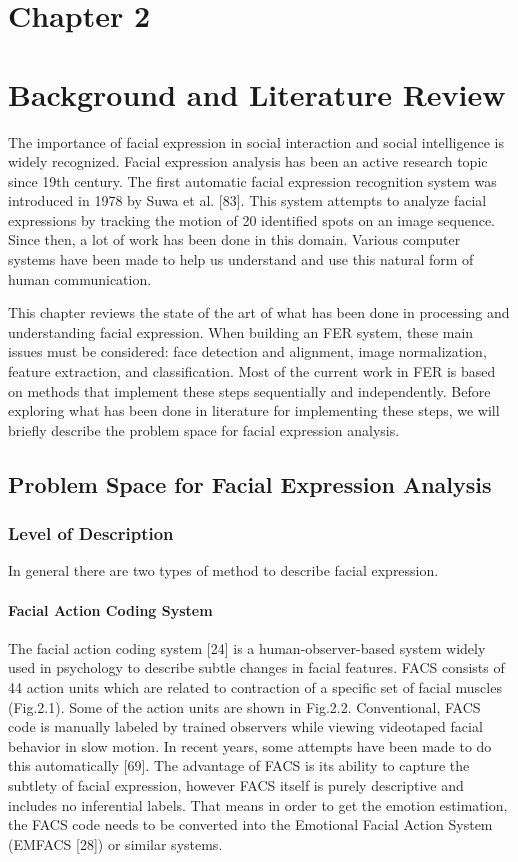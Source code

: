 \documentclass[12pt, twoside]{report}
\begin{document}
\chapter{Chapter 2}
 
\chapter{\huge Background and Literature Review}
The importance of facial expression in social interaction and social intelligence is widely
recognized. Facial expression analysis has been an active research topic since 19th century.
The first automatic facial expression recognition system was introduced in 1978 by Suwa
et al. [83]. This system attempts to analyze facial expressions by tracking the motion of
20 identified spots on an image sequence. Since then, a lot of work has been done in this
domain. Various computer systems have been made to help us understand and use this
natural form of human communication.\par
This chapter reviews the state of the art of what has been done in processing and
understanding facial expression. When building an FER system, these main issues must
be considered: face detection and alignment, image normalization, feature extraction, and
classification. Most of the current work in FER is based on methods that implement these
steps sequentially and independently. Before exploring what has been done in literature for
implementing these steps, we will briefly describe the problem space for facial expression
analysis.
\section{Problem Space for Facial Expression Analysis}
\subsection{Level of Description}
In general there are two types of method to describe facial expression.
\newpage
\subsubsection{Facial Action Coding System}
\par 
The facial action coding system [24] is a human-observer-based system widely used in
psychology to describe subtle changes in facial features. FACS consists of 44 action units
which are related to contraction of a specific set of facial muscles (Fig.2.1). Some of the
action units are shown in Fig.2.2. Conventional, FACS code is manually labeled by trained
observers while viewing videotaped facial behavior in slow motion. In recent years, some
attempts have been made to do this automatically [69]. The advantage of FACS is its ability
to capture the subtlety of facial expression, however FACS itself is purely descriptive and
includes no inferential labels. That means in order to get the emotion estimation, the FACS
code needs to be converted into the Emotional Facial Action System (EMFACS [28]) or
similar systems.\\
\end{document}

